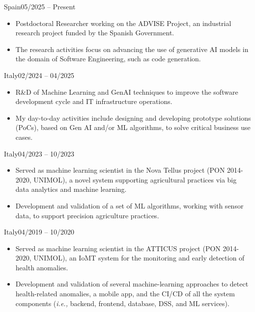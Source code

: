 
	{Spain}{05/2025 – Present}
	\begin{itemize}
		\item Postdoctoral Researcher working on the ADVISE Project, an industrial research project funded by the Spanish Government.
		\item The research activities focus on advancing the use of generative AI models in the domain of Software Engineering, such as code generation.
	\end{itemize}
		
	\medskip

	{Italy}{02/2024 – 04/2025}
	\begin{itemize}
		\item R\&D of Machine Learning and GenAI techniques to improve the software development cycle and IT infrastructure operations.
		\item My day-to-day activities include designing and developing prototype solutions (PoCs), based on Gen AI and/or ML algorithms, to solve critical business use cases.
	\end{itemize}
		
	\medskip

	{Italy}{04/2023 – 10/2023}
	\begin{itemize}
            \item Served as machine learning scientist in the Nova Tellus project (PON 2014-2020, UNIMOL), a novel system supporting agricultural practices via big data analytics and machine learning.
            \item Development and validation of a set of ML algorithms, working with sensor data, to support precision agriculture practices.
	\end{itemize}
	
	\medskip
	
	{Italy}{04/2019 – 10/2020}
	\begin{itemize}
		\item Served as machine learning scientist in the ATTICUS project (PON 2014-2020, UNIMOL), an IoMT system for the monitoring and early detection of health anomalies.
		\item Development and validation of several machine-learning approaches to detect health-related anomalies, a mobile app, and the CI/CD of all the system components (\emph{i.e.,} backend, frontend, database, DSS, and ML services).
	\end{itemize}

